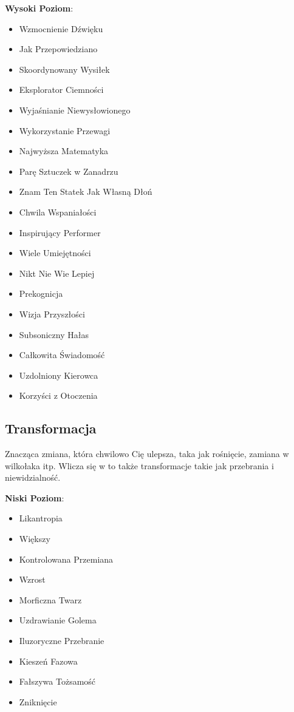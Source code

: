 \textbf{Wysoki Poziom}:

\begin{itemize}
\item Wzmocnienie Dźwięku
\item Jak Przepowiedziano
\item Skoordynowany Wysiłek
\item Eksplorator Ciemności
\item Wyjaśnianie Niewysłowionego
\item Wykorzystanie Przewagi
\item Najwyższa Matematyka
\item Parę Sztuczek w Zanadrzu
\item Znam Ten Statek Jak Własną Dłoń
\item Chwila Wspaniałości
\item Inspirujący Performer
\item Wiele Umiejętności
\item Nikt Nie Wie Lepiej
\item Prekognicja
\item Wizja Przyszłości
\item Subsoniczny Hałas
\item Całkowita Świadomość
\item Uzdolniony Kierowca
\item Korzyści z Otoczenia
\end{itemize}

\subsection{Transformacja}

Znacząca zmiana, która chwilowo Cię ulepsza, taka jak rośnięcie, zamiana w wilkołaka itp. Wlicza się w to także transformacje takie jak przebrania i niewidzialność. 

\textbf{Niski Poziom}:

\begin{itemize}
\item Likantropia
\item Większy
\item Kontrolowana Przemiana
\item Wzrost
\item Morficzna Twarz
\item Uzdrawianie Golema
\item Iluzoryczne Przebranie
\item Kieszeń Fazowa
\item Fałszywa Tożsamość
\item Zniknięcie
\end{itemize}
 

